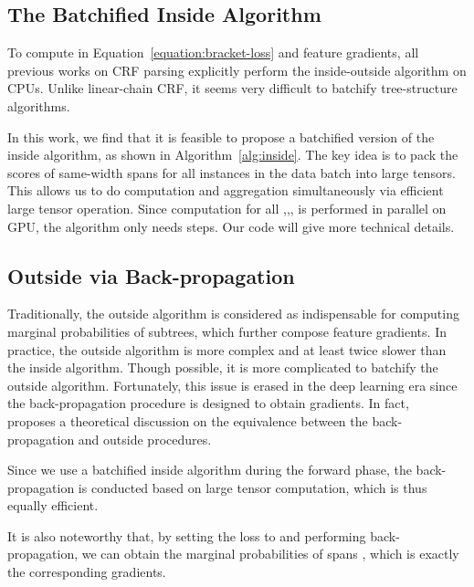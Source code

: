 \documentclass{article}
\begin{document}
\subsection{The Batchified Inside Algorithm}

To compute  in Equation~\ref{equation:bracket-loss} and feature gradients, all previous works on CRF parsing \cite{finkel-etal-2008-efficient,durrett-klein-2015-neural} explicitly perform the inside-outside algorithm on CPUs.
Unlike linear-chain CRF, it seems very difficult to batchify tree-structure algorithms.



In this work, we find that it is feasible to propose a batchified version of the inside algorithm, as shown in Algorithm~\ref{alg:inside}.
The key idea is to pack the scores of same-width spans for all instances in the data batch into large tensors.
This allows us to do computation and aggregation simultaneously via efficient large tensor operation.
Since computation for all ,,, is performed in parallel on GPU, the algorithm only needs  steps. Our code will give more technical details.



\subsection{Outside via Back-propagation}

Traditionally, the outside algorithm is considered as indispensable for computing marginal probabilities of subtrees, which further compose feature gradients.
In practice, the outside algorithm is more complex and at least twice slower than the inside algorithm.
Though possible, it is more complicated to batchify the outside algorithm.
Fortunately, this issue is erased in the deep learning era since the back-propagation procedure is designed to obtain gradients. In fact, \citeauthor{eisner-2016-inside}~ proposes a theoretical discussion on the equivalence between the back-propagation and outside procedures.

Since we use a batchified inside algorithm during the forward phase, the back-propagation is conducted based on large tensor computation, which is thus equally efficient.








It is also noteworthy that, by setting the loss to  and performing back-propagation, we can obtain the marginal probabilities of spans , which is exactly the corresponding gradients.
\end{document}

